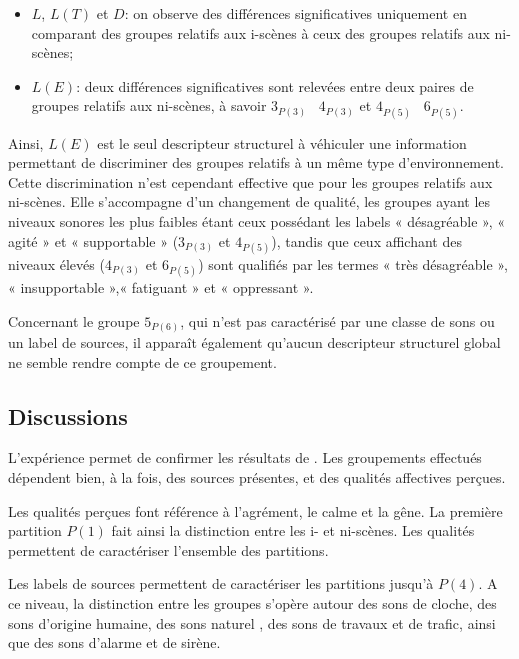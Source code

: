 \begin{itemize}
\item $L$, $L(T)$ et $D$: on observe des différences significatives uniquement en comparant des groupes relatifs aux i-scènes à ceux des groupes relatifs aux ni-scènes;
\item $L(E)$: deux différences significatives sont relevées entre deux paires de groupes relatifs aux ni-scènes, à savoir $3_{P(3)}$ \vs~$4_{P(3)}$ et $4_{P(5)}$ \vs~$6_{P(5)}$.
\end{itemize}

Ainsi, $L(E)$ est le seul descripteur structurel à véhiculer une information permettant de discriminer des groupes relatifs à un même type d'environnement. Cette discrimination n'est cependant effective que pour les groupes relatifs aux ni-scènes. Elle s'accompagne d'un changement de qualité, les groupes ayant les niveaux sonores les plus faibles étant ceux possédant les labels « désagréable », « agité » et « supportable » ($3_{P(3)}$ et $4_{P(5)}$), tandis que ceux affichant des niveaux élevés ($4_{P(3)}$ et $6_{P(5)}$) sont qualifiés par les termes « très désagréable », « insupportable »,« fatiguant » et « oppressant ».

Concernant le groupe $5_{P(6)}$, qui n'est pas caractérisé par une classe de sons ou un label de sources, il apparaît également qu'aucun descripteur structurel global ne semble rendre compte de ce groupement.



\subsection{Discussions}

L'expérience permet de confirmer les résultats de \citep{maffiolo_caracterisation_1999}. Les groupements effectués dépendent bien, à la fois, des sources présentes, et des qualités affectives perçues.

Les qualités perçues font référence à l'agrément, le calme et la gêne. La première partition $P(1)$ fait ainsi la distinction entre les i- et ni-scènes. Les qualités permettent de caractériser l'ensemble des partitions.

Les labels de sources permettent de caractériser les partitions jusqu'à $P(4)$. A ce niveau, la distinction entre les groupes s'opère autour des sons de cloche, des sons d'origine humaine, des sons naturel , des sons de travaux et de trafic, ainsi que des sons d'alarme et de sirène.

